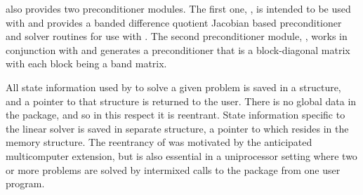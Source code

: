 {\cvodes} also provides two preconditioner modules. The first one, 
{\cvbandpre}, is intended to be used with {\nvecs} and provides
a banded difference quotient Jacobian based preconditioner and solver
routines for use with {\cvspgmr}. The second preconditioner module, 
{\cvbbdpre}, works in conjunction with {\nvecp} and generates a 
preconditioner that is a block-diagonal matrix with each block being 
a band matrix.

All state information used by {\cvodes} to solve a given problem is saved
in a structure, and a pointer to that structure is returned to the
user.  There is no global data in the {\cvodes} package, and so in this
respect it is reentrant. State information specific to the linear
solver is saved in separate structure, a pointer to which resides in
the {\cvodes} memory structure. The reentrancy of {\cvodes} was motivated
by the anticipated multicomputer extension, but is also essential
in a uniprocessor setting where two or more problems are solved by
intermixed calls to the package from one user program.

